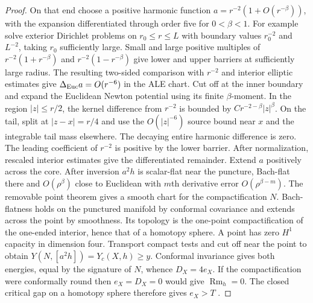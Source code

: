 \documentclass[11pt,letterpaper]{article}
\DeclareMathOperator{\Rm}{Rm}
\begin{document}
\begin{proof}
On that end choose a positive harmonic function
\(a=r^{-2}(1+O(r^{-\beta}))\), with the expansion differentiated
through order five for \(0<\beta<1\). For example solve exterior
Dirichlet problems on \(r_0\le r\le L\) with boundary values
\(r_0^{-2}\) and \(L^{-2}\), taking \(r_0\) sufficiently large.
Small and large positive multiples
of \(r^{-2}(1+r^{-\beta})\) and \(r^{-2}(1-r^{-\beta})\) give lower
and upper barriers at sufficiently large radius. The resulting
two-sided comparison with \(r^{-2}\) and interior elliptic estimates
give \(\Delta_{\rm Euc}a=O(r^{-6})\) in the ALE chart. Cut off at
the inner boundary and expand the Euclidean Newton potential using
its finite \(\beta\)-moment. In the region \(|z|\le r/2\), the kernel
difference from \(r^{-2}\) is bounded by \(C r^{-2-\beta}|z|^\beta\).
On the tail, split at \(|z-x|=r/4\) and use the \(O(|z|^{-6})\)
source bound near \(x\) and the integrable tail mass elsewhere.
The decaying entire harmonic difference is zero.
The leading coefficient of \(r^{-2}\)
is positive by the lower barrier. After normalization, rescaled interior estimates give the differentiated remainder. Extend \(a\) positively
across the core. After inversion \(a^2h\) is scalar-flat near the
puncture, Bach-flat there and \(O(\rho^\beta)\) close to Euclidean
with \(m\)th derivative error \(O(\rho^{\beta-m})\).
The removable point theorem \cite[Definition 1.6, Theorem 1.8 and
Remark 7.2]{AcheViaclovsky2011Obstruction} gives a smooth chart
for the compactification \(N\). Bach-flatness holds on the punctured
manifold by conformal covariance and extends across the point by
smoothness. Its topology is the one-point
compactification of the one-ended interior, hence that of a homotopy
sphere. A point has zero \(H^1\) capacity in dimension four.
Transport compact tests and cut off near the point to obtain
\(Y(N,[a^2h])=Y_c(X,h)\ge y\). Conformal invariance gives both
energies, equal by the signature of \(N\), whence \(D_X=4e_X\).
If the compactification were conformally round then \(e_X=D_X=0\)
would give \(\Rm_h=0\). The closed critical gap on a homotopy sphere
therefore gives \(e_X>T\)
\cite{ChangGurskyYang2003,ChangChen2021RicciSphere,Baker2026MarkedNecks}.


\end{proof}
\end{document}
